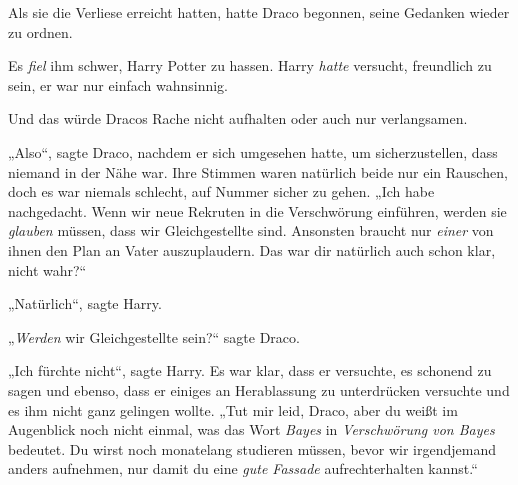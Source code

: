 Als sie die Verliese erreicht hatten, hatte Draco begonnen, seine Gedanken wieder zu ordnen.

Es \emph{fiel} ihm schwer, Harry Potter zu hassen. Harry \emph{hatte} versucht, freundlich zu sein, er war nur einfach wahnsinnig.

Und das würde Dracos Rache nicht aufhalten oder auch nur verlangsamen.

„Also“, sagte Draco, nachdem er sich umgesehen hatte, um sicherzustellen, dass niemand in der Nähe war. Ihre Stimmen waren natürlich beide nur ein Rauschen, doch es war niemals schlecht, auf Nummer sicher zu gehen. „Ich habe nachgedacht. Wenn wir neue Rekruten in die Verschwörung einführen, werden sie \emph{glauben} müssen, dass wir Gleichgestellte sind. Ansonsten braucht nur \emph{einer} von ihnen den Plan an Vater auszuplaudern. Das war dir natürlich auch schon klar, nicht wahr?“

„Natürlich“, sagte Harry.

„\emph{Werden} wir Gleichgestellte sein?“ sagte Draco.

„Ich fürchte nicht“, sagte Harry. Es war klar, dass er versuchte, es schonend zu sagen und ebenso, dass er einiges an Herablassung zu unterdrücken versuchte und es ihm nicht ganz gelingen wollte. „Tut mir leid, Draco, aber du weißt im Augenblick noch nicht einmal, was das Wort \emph{Bayes} in \emph{Verschwörung von Bayes} bedeutet. Du wirst noch monatelang studieren müssen, bevor wir irgendjemand anders aufnehmen, nur damit du eine \emph{gute Fassade} aufrechterhalten kannst.“


